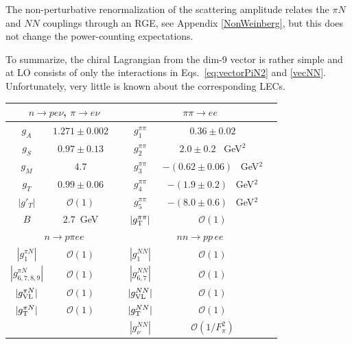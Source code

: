 \documentclass[letterpaper,11pt]{article}
\newcommand{\Or}{\mathcal O}
\begin{document}
The non-perturbative renormalization of the scattering amplitude relates the $\pi N$ and $N\!N$ couplings through an RGE, see Appendix \ref{NonWeinberg}, but this does not change the power-counting expectations.


To summarize, the chiral Lagrangian from the dim-9 vector is rather simple and at LO consists of only the interactions in Eqs.~\eqref{eq:vectorPiN2} and \eqref{vecNN}. Unfortunately, very little is known about the corresponding LECs. 
\begin{table}
\center
\begin{tabular}{|c|cc||c|cc|}
\hline
 \multicolumn{3}{|c||}{ $n\rightarrow pe\nu$, $\pi \rightarrow e \nu$ } &  \multicolumn{3}{c|}{$\pi \pi \rightarrow e e$} \\
 \hline
 $g_A$ & $1.271\pm 0.002$ & \cite{Olive:2016xmw}      & $g^{\pi\pi}_{1}$   		& $  0.36 \pm 0.02 $             & \cite{Nicholson:2018mwc}  \\
 $g_S$ & $0.97\pm 0.13$ & \cite{Bhattacharya:2016zcn} & $g^{\pi\pi}_{2}$   		& $  2.0  \pm 0.2 $  \, GeV$^2$  & \cite{Nicholson:2018mwc}  \\
 $g_M$ &  $ 4.7$ &  \cite{Olive:2016xmw}              & $g^{\pi\pi}_{3}$ 	        & $ -(0.62 \pm 0.06)$  \, GeV$^2$  & \cite{Nicholson:2018mwc}  \\
 $g_T$ & $0.99\pm 0.06$ & \cite{Bhattacharya:2016zcn} & $g^{\pi\pi}_{4}$   		& $ -(1.9  \pm 0.2)$   \, GeV$^2$  & \cite{Nicholson:2018mwc}\\  
 $|g'_{T}|$ & $\mathcal O(1)$  	&		      & $g^{\pi\pi}_{5}$ 		& $ -(8.0  \pm 0.6)$   \, GeV$^2$  & \cite{Nicholson:2018mwc}  \\
 $B$      &    $2.7$~GeV       &     & $|g^{\pi\pi}_{ \rm T}|$     & $\mathcal O(1)$  & \\ 
 \hline
  \multicolumn{3}{|c||}{$n \rightarrow p\pi ee$} & \multicolumn{3}{c|}{$nn\rightarrow pp\, ee$}   
 \\
  \hline 
   $|g^{\pi N}_{1} |$       & $\mathcal{O}(1)$ &    & $|g^{N N}_1|$         & $\mathcal{O}(1)$ &  \\  
   $|g^{\pi N}_{6,7,8,9}|$ & $\mathcal{O}(1)$ &    & $|g_{6,7}^{N N}|$ & $\mathcal{O}(1)$ & \\
     $|g^{\pi N}_{\rm VL}|$ & $\mathcal{O}(1)$ &    &$ |g^{NN}_{\rm VL}|$ & $ \mathcal{O}(1) $ &     \\ 
           $|g^{\pi N}_{\rm T}|$ 			   & 		$ \Or(1)$     &    &
        $ |g_{\rm T}^{NN}|$ &$\Or(1)$&   
  \\ 
			   & 		      &    & $ |g^{NN}_{\nu}|$ & $ \mathcal{O}(1/F_\pi^2) $ &     \\ 

\end{tabular}
\end{table}
\end{document}
